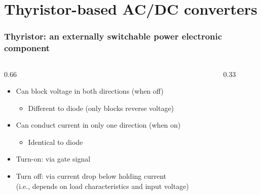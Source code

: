 \section{Thyristor-based AC/DC converters}

\begin{frame}[c]
	\frametitle{Thyristor: an externally switchable power electronic component}
	\begin{columns}
		\begin{column}{0.66\textwidth}
			\begin{itemize}
				\item Can block voltage in both directions (when off)
				      \begin{itemize}
					      \item Different to diode (only blocks reverse voltage)
				      \end{itemize}
				\item Can conduct current in only one direction (when on)
				      \begin{itemize}
					      \item Identical to diode
				      \end{itemize}
				\item<2-> Turn-on: via gate signal
				\item<3-> Turn off: via current drop below holding current \\(i.e., depends on load characteristics and input voltage)
			\end{itemize}
			\vspace{-0.7cm}
		\end{column}
		\begin{column}{0.33\textwidth}
			\centering


\end{column}
\end{columns}
\end{frame}
